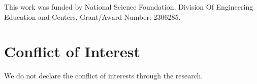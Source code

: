 \documentclass[12pt]{article}
\begin{document}
This work was funded by National Science Foundation, Division Of Engineering Education and Centers, Grant/Award Number: 2306285.

\section*{Conflict of Interest}
We do not declare the conflict of interests through the research.


\end{document}
